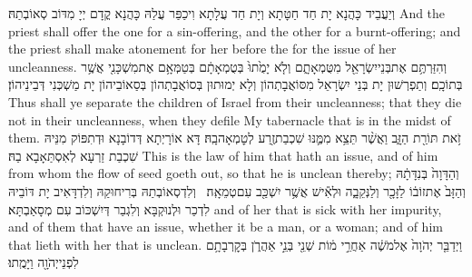{וְיַעֲבֵיד כָּהֲנָא יָת חַד חַטָּתָא וְיָת חַד עֲלָתָא וִיכַפַּר עֲלַהּ כָּהֲנָא קֳדָם יְיָ מִדּוֹב סְאוֹבְתַהּ׃}
{And the priest shall offer the one for a sin-offering, and the other for a burnt-offering; and the priest shall make atonement for her before the \lord\space for the issue of her uncleanness.}{}
{וְהִזַּרְתֶּ֥ם אֶת\maqqaf בְּנֵי\maqqaf יִשְׂרָאֵ֖ל מִטֻּמְאָתָ֑ם וְלֹ֤א יָמֻ֙תוּ֙ בְּטֻמְאָתָ֔ם בְּטַמְּאָ֥ם אֶת\maqqaf מִשְׁכָּנִ֖י אֲשֶׁ֥ר בְּתוֹכָֽם׃}
{וְתַפְרְשׁוּן יָת בְּנֵי יִשְׂרָאֵל מִסּוֹאֲבָתְהוֹן וְלָא יְמוּתוּן בְּסוֹאֲבָתְהוֹן בְּסַאוֹבֵיהוֹן יָת מַשְׁכְּנִי דְּבֵינֵיהוֹן׃}
{Thus shall ye separate the children of Israel from their uncleanness; that they die not in their uncleanness, when they defile My tabernacle that is in the midst of them.}{}
{זֹ֥את תּוֹרַ֖ת הַזָּ֑ב וַאֲשֶׁ֨ר תֵּצֵ֥א מִמֶּ֛נּוּ שִׁכְבַת\maqqaf זֶ֖רַע לְטׇמְאָה\maqqaf בָֽהּ׃}
{דָּא אוֹרָיְתָא דְּדוֹבָנָא וּדְתִפּוֹק מִנֵּיהּ שִׁכְבַת זַרְעָא לְאִסְתַּאָבָא בַהּ׃}
{This is the law of him that hath an issue, and of him from whom the flow of seed goeth out, so that he is unclean thereby;}{}
{וְהַדָּוָה֙ בְּנִדָּתָ֔הּ וְהַזָּב֙ אֶת\maqqaf זוֹב֔וֹ לַזָּכָ֖ר וְלַנְּקֵבָ֑ה וּלְאִ֕ישׁ אֲשֶׁ֥ר יִשְׁכַּ֖ב עִם\maqqaf טְמֵאָֽה׃ \petucha }
{וְלִדְסְאוֹבְתַהּ בְּרִיחוּקַהּ וְלִדְדָּאִיב יָת דּוֹבֵיהּ לִדְכַר וּלְנוּקְבָּא וְלִגְבַר דְּיִשְׁכּוֹב עִם מְסָאַבְתָּא׃}
{and of her that is sick with her impurity, and of them that have an issue, whether it be a man, or a woman; and of him that lieth with her that is unclean.}{}
\newperek
{}
{וַיְדַבֵּ֤ר יְהֹוָה֙ אֶל\maqqaf מֹשֶׁ֔ה אַחֲרֵ֣י מ֔וֹת שְׁנֵ֖י בְּנֵ֣י אַהֲרֹ֑ן בְּקׇרְבָתָ֥ם לִפְנֵי\maqqaf יְהֹוָ֖ה וַיָּמֻֽתוּ׃}
